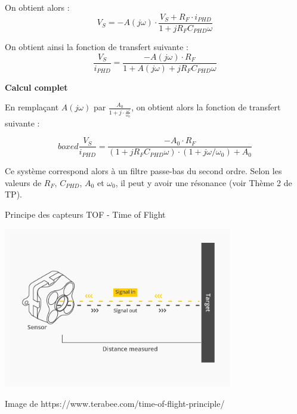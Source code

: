 \documentclass[a4paper,french]{paper}
\begin{document}
On obtient alors : $$V_S = - A(j\omega) \cdot \frac{V_S + R_F \cdot i_{PHD}}{1 + j R_F C_{PHD} \omega}$$

On obtient ainsi la fonction de transfert suivante : 
$$\boxed{\frac{V_S}{i_{PHD}} = \frac{- A(j\omega) \cdot R_F}{1 + A(j\omega) + j R_F C_{PHD} \omega}}$$

\textbf{Calcul complet}

En remplaçant $A(j\omega)$ par $\frac{A_0}{1 + j \cdot \frac{\omega}{\omega_0}}$, on obtient alors la fonction de transfert suivante :

$$boxed{\frac{V_S}{i_{PHD}} = \frac{- A_0 \cdot R_F}{(1 + j R_F C_{PHD} \omega) \cdot (1 + j \omega/\omega_0) + A_0}}$$

Ce système correspond alors à un filtre passe-bas du second ordre. Selon les valeurs de $R_F$, $C_{PHD}$, $A_0$ et $\omega_0$, il peut y avoir une résonance (voir Thème 2 de TP).

\newpage

Principe des capteurs TOF - Time of Flight

\begin{center}
	\includegraphics[width=10cm]{images/tof_sensors_terabee.png}
\end{center}

Image de https://www.terabee.com/time-of-flight-principle/

\end{document}
